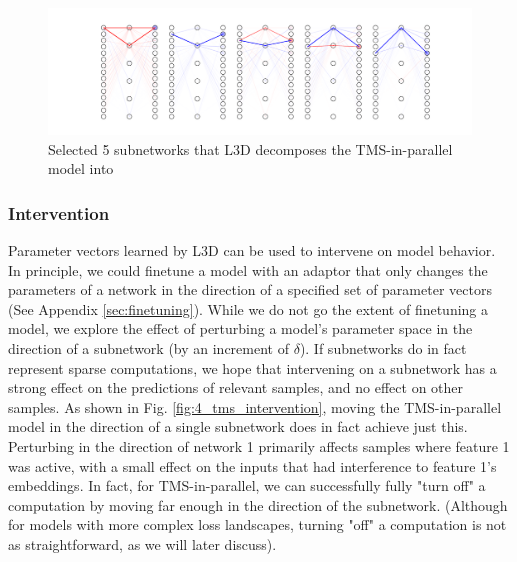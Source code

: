\documentclass{article}
\theoremstyle{plain}
\theoremstyle{definition}
\theoremstyle{remark}
\begin{document}
\begin{figure}
    \centerline{\includegraphics[width=\textwidth]{../figures/3_tms_first_5_subnetworks.pdf}}
    \centering
    \caption{Selected 5 subnetworks that L3D decomposes the TMS-in-parallel model into}\label{fig:3_tms_subnetworks_first5}
\end{figure}


\subsubsection{Intervention}

Parameter vectors learned by L3D can be used to intervene on model behavior. In principle, we could finetune a model with an adaptor that only changes the parameters of a network in the direction of a specified set of parameter vectors (See Appendix \ref{sec:finetuning}). While we do not go the extent of finetuning a model, we explore the effect of perturbing a model's parameter space in the direction of a subnetwork (by an increment of $\delta$). If subnetworks do in fact represent sparse computations, we hope that intervening on a subnetwork has a strong effect on the predictions of relevant samples, and no effect on other samples. As shown in Fig. \ref{fig:4_tms_intervention}, moving the TMS-in-parallel model in the direction of a single subnetwork does in fact achieve just this. Perturbing in the direction of network 1 primarily affects samples where feature 1 was active, with a small effect on the inputs that had interference to feature 1's embeddings. In fact, for TMS-in-parallel, we can successfully fully "turn off" a computation by moving far enough in the direction of the subnetwork. (Although for models with more complex loss landscapes, turning "off" a computation is not as straightforward, as we will later discuss).
\end{document}
